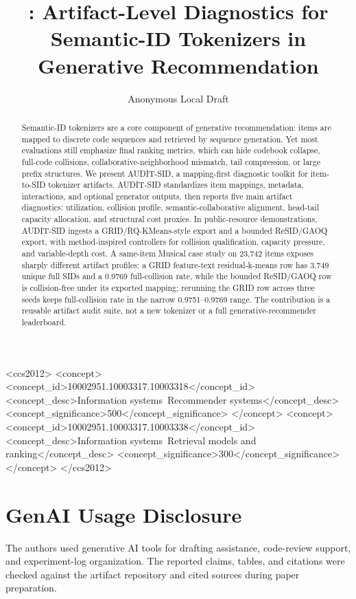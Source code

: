 \documentclass[sigconf,review,anonymous]{acmart}
\title{\tool: Artifact-Level Diagnostics for Semantic-ID Tokenizers in Generative Recommendation}
\author{Anonymous Local Draft}
\affiliation{%
  \institution{Anonymous Institution}
  \country{}
}
\newcommand{\tool}{AUDIT-SID\xspace}
\newcommand{\sid}{SID\xspace}
\begin{document}
\begin{CCSXML}
<ccs2012>
 <concept>
  <concept_id>10002951.10003317.10003318</concept_id>
  <concept_desc>Information systems~Recommender systems</concept_desc>
  <concept_significance>500</concept_significance>
 </concept>
 <concept>
  <concept_id>10002951.10003317.10003338</concept_id>
  <concept_desc>Information systems~Retrieval models and ranking</concept_desc>
  <concept_significance>300</concept_significance>
 </concept>
</ccs2012>
\end{CCSXML}


\begin{abstract}
Semantic-ID tokenizers are a core component of generative recommendation:
items are mapped to discrete code sequences and retrieved by sequence
generation. Yet most evaluations still emphasize final ranking metrics, which
can hide codebook collapse, full-code collisions, collaborative-neighborhood
mismatch, tail compression, or large prefix structures. We present
\tool, a mapping-first diagnostic toolkit for item-to-\sid tokenizer
artifacts. \tool standardizes item mappings, metadata, interactions, and
optional generator outputs, then reports five main artifact diagnostics:
utilization, collision profile, semantic-collaborative alignment, head-tail
capacity allocation, and structural cost proxies. In public-resource
demonstrations, \tool ingests a GRID/RQ-KMeans-style export and a bounded
ReSID/GAOQ export, with method-inspired controllers for collision
qualification, capacity pressure, and variable-depth cost. A
same-item Musical case study on 23,742 items exposes sharply different artifact profiles: a
GRID feature-text residual-k-means row has 3,749 unique full \sid{}s and a
0.9769 full-collision rate, while the bounded ReSID/GAOQ row is
collision-free under its exported mapping; rerunning the GRID row across three
seeds keeps full-collision rate in the narrow 0.9751--0.9769 range. The contribution is a reusable
artifact audit suite, not a new tokenizer or a full generative-recommender
leaderboard.
\end{abstract}

\maketitle






\clearpage



\section*{GenAI Usage Disclosure}
The authors used generative AI tools for drafting assistance, code-review
support, and experiment-log organization. The reported claims, tables, and
citations were checked against the artifact repository and cited sources during
paper preparation.
\end{document}
